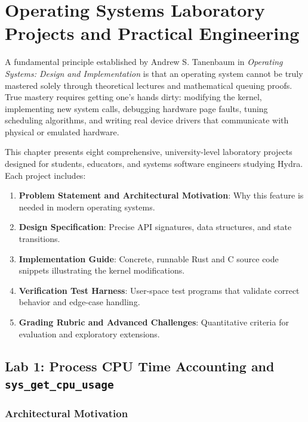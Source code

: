 \chapter{Operating Systems Laboratory Projects and Practical Engineering}
\label{chap:labs}

A fundamental principle established by Andrew S. Tanenbaum in \textit{Operating Systems: Design and Implementation} is that an operating system cannot be truly mastered solely through theoretical lectures and mathematical queuing proofs. True mastery requires getting one's hands dirty: modifying the kernel, implementing new system calls, debugging hardware page faults, tuning scheduling algorithms, and writing real device drivers that communicate with physical or emulated hardware.

This chapter presents eight comprehensive, university-level laboratory projects designed for students, educators, and systems software engineers studying Hydra. Each project includes:
\begin{enumerate}
    \item \textbf{Problem Statement and Architectural Motivation}: Why this feature is needed in modern operating systems.
    \item \textbf{Design Specification}: Precise API signatures, data structures, and state transitions.
    \item \textbf{Implementation Guide}: Concrete, runnable Rust and C source code snippets illustrating the kernel modifications.
    \item \textbf{Verification Test Harness}: User-space test programs that validate correct behavior and edge-case handling.
    \item \textbf{Grading Rubric and Advanced Challenges}: Quantitative criteria for evaluation and exploratory extensions.
\end{enumerate}

\section{Lab 1: Process CPU Time Accounting and \texttt{sys\_get\_cpu\_usage}}
\label{sec:lab1}

\subsection{Architectural Motivation}

